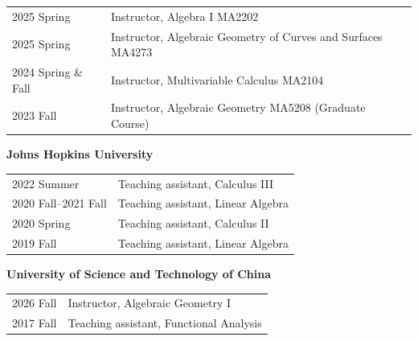 \documentclass[margin,line,pifont,palatino,courier]{res}
\newenvironment{list1}{
  \begin{list}{\ding{113}}{%
      \setlength{\itemsep}{0in}
      \setlength{\parsep}{0in} \setlength{\parskip}{0in}
      \setlength{\topsep}{0in} \setlength{\partopsep}{0in}
      \setlength{\leftmargin}{0.17in}}}{\end{list}}
\begin{document}
\begin{resume}
\begin{tabular}{@{}p{1.5in}p{4in}}
2025 Spring & Instructor, Algebra I MA2202\\
2025 Spring & Instructor, Algebraic Geometry of Curves and Surfaces MA4273\\
2024 Spring \& Fall & Instructor, Multivariable Calculus MA2104\\
2023 Fall & Instructor, Algebraic Geometry MA5208 (Graduate Course)
\end{tabular}

{\bf  Johns Hopkins University}

\begin{tabular}{@{}p{1.5in}p{4in}}
2022 Summer & Teaching assistant, Calculus III \\
2020 Fall--2021 Fall & Teaching assistant, Linear Algebra \\
2020 Spring & Teaching assistant, Calculus II  \\
2019 Fall & Teaching assistant, Linear Algebra \\
\end{tabular}

{\bf  University of Science and Technology of China}

\begin{tabular}{@{}p{1.5in}p{4in}}
2026 Fall & Instructor, Algebraic Geometry I\\
2017 Fall & Teaching assistant, Functional Analysis\\
\end{tabular}






\end{resume}
\end{document}
